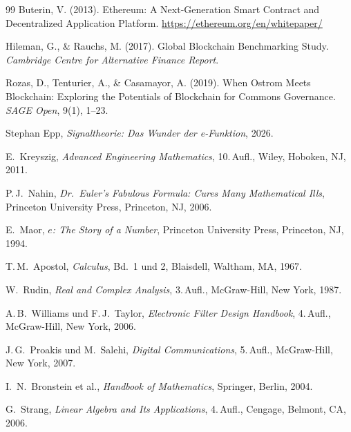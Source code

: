 \documentclass[a4paper, 12pt, twoside, openright]{report}
\theoremstyle{definition}
\theoremstyle{definition}
\begin{document}
\begin{thebibliography}{99}
Buterin, V. (2013).
\newblock Ethereum: A Next-Generation Smart Contract and Decentralized Application Platform.
\newblock \url{https://ethereum.org/en/whitepaper/}

Hileman, G., \& Rauchs, M. (2017).
\newblock Global Blockchain Benchmarking Study.
\newblock \emph{Cambridge Centre for Alternative Finance Report}.

Rozas, D., Tenturier, A., \& Casamayor, A. (2019).
\newblock When Ostrom Meets Blockchain: Exploring the Potentials of Blockchain for Commons Governance.
\newblock \emph{SAGE Open}, 9(1), 1--23.

	Stephan Epp,
	\textit{Signaltheorie: Das Wunder der e-Funktion},
	2026.
	
	E.~Kreyszig,
	\textit{Advanced Engineering Mathematics},
	10.\,Aufl., Wiley, Hoboken, NJ, 2011.
	
	P.\,J.~Nahin,
	\textit{Dr.\ Euler's Fabulous Formula: Cures Many Mathematical Ills},
	Princeton University Press, Princeton, NJ, 2006.
	
	E.~Maor,
	\textit{$e$: The Story of a Number},
	Princeton University Press, Princeton, NJ, 1994.
	
	T.\,M.~Apostol,
	\textit{Calculus}, Bd.~1 und 2,
	Blaisdell, Waltham, MA, 1967.
	
	W.~Rudin,
	\textit{Real and Complex Analysis},
	3.\,Aufl., McGraw-Hill, New York, 1987.
	
	A.\,B.~Williams und F.\,J.~Taylor,
	\textit{Electronic Filter Design Handbook},
	4.\,Aufl., McGraw-Hill, New York, 2006.
	
	J.\,G.~Proakis und M.~Salehi,
	\textit{Digital Communications},
	5.\,Aufl., McGraw-Hill, New York, 2007.

	I.~N.~Bronstein et al.,
	\textit{Handbook of Mathematics},
	Springer, Berlin, 2004.

	G.~Strang,
	\textit{Linear Algebra and Its Applications},
	4.\,Aufl., Cengage, Belmont, CA, 2006.


\end{thebibliography}
\end{document}
